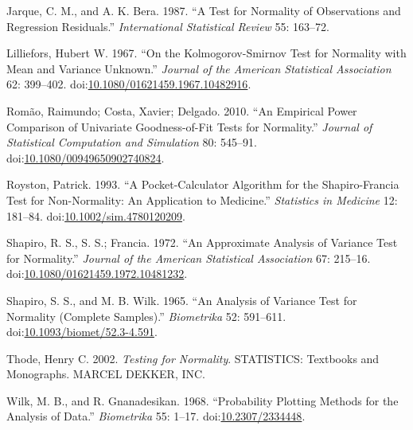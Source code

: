 \documentclass[]{article}
\begin{document}
\hypertarget{ref-JarqueBera1987}{}
Jarque, C. M., and A. K. Bera. 1987. ``A Test for Normality of
Observations and Regression Residuals.'' \emph{International Statistical
Review} 55: 163--72.

\hypertarget{ref-Lilliefors1967}{}
Lilliefors, Hubert W. 1967. ``On the Kolmogorov-Smirnov Test for
Normality with Mean and Variance Unknown.'' \emph{Journal of the
American Statistical Association} 62: 399--402.
doi:\href{https://doi.org/10.1080/01621459.1967.10482916}{10.1080/01621459.1967.10482916}.

\hypertarget{ref-Romao2010}{}
Romão, Raimundo; Costa, Xavier; Delgado. 2010. ``An Empirical Power
Comparison of Univariate Goodness-of-Fit Tests for Normality.''
\emph{Journal of Statistical Computation and Simulation} 80: 545--91.
doi:\href{https://doi.org/10.1080/00949650902740824}{10.1080/00949650902740824}.

\hypertarget{ref-RoystonSF1993}{}
Royston, Patrick. 1993. ``A Pocket-Calculator Algorithm for the
Shapiro-Francia Test for Non-Normality: An Application to Medicine.''
\emph{Statistics in Medicine} 12: 181--84.
doi:\href{https://doi.org/10.1002/sim.4780120209}{10.1002/sim.4780120209}.

\hypertarget{ref-ShapiroFrancia1972}{}
Shapiro, R. S., S. S.; Francia. 1972. ``An Approximate Analysis of
Variance Test for Normality.'' \emph{Journal of the American Statistical
Association} 67: 215--16.
doi:\href{https://doi.org/10.1080/01621459.1972.10481232}{10.1080/01621459.1972.10481232}.

\hypertarget{ref-ShapiroWilk1965}{}
Shapiro, S. S., and M. B. Wilk. 1965. ``An Analysis of Variance Test for
Normality (Complete Samples).'' \emph{Biometrika} 52: 591--611.
doi:\href{https://doi.org/10.1093/biomet/52.3-4.591}{10.1093/biomet/52.3-4.591}.

\hypertarget{ref-Thode2002}{}
Thode, Henry C. 2002. \emph{Testing for Normality}. STATISTICS:
Textbooks and Monographs. MARCEL DEKKER, INC.

\hypertarget{ref-Wilk1968}{}
Wilk, M. B., and R. Gnanadesikan. 1968. ``Probability Plotting Methods
for the Analysis of Data.'' \emph{Biometrika} 55: 1--17.
doi:\href{https://doi.org/10.2307/2334448}{10.2307/2334448}.
\end{document}
